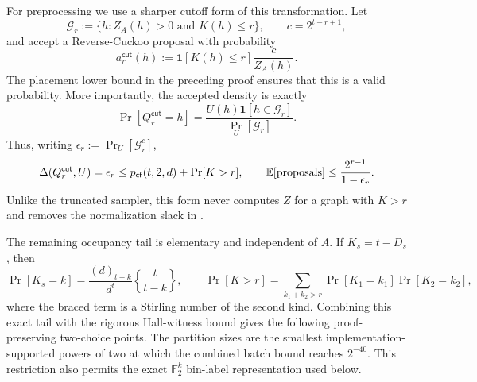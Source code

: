 For preprocessing we use a sharper cutoff form of this transformation.  Let
\[
 \mathcal G_r:=\{h:Z_A(h)>0\text{ and }K(h)\leq r\},
 \qquad c=2^{t-r+1},
\]
and accept a Reverse-Cuckoo proposal with probability
\begin{equation}\label{eq:rev-cuckoo-cutoff-accept}
 a_r^{\mathsf{cut}}(h)
 :=\mathbf 1[K(h)\leq r]\frac{c}{Z_A(h)}.
\end{equation}
The placement lower bound in the preceding proof ensures that this is a
valid probability.  More importantly, the accepted density is exactly
\begin{equation}\label{eq:rev-cuckoo-cutoff-distribution}
 \Pr[Q_r^{\mathsf{cut}}=h]
 =\frac{U(h)\mathbf 1[h\in\mathcal G_r]}{\Pr_U[\mathcal G_r]}.
\end{equation}
Thus, writing $\epsilon_r:=\Pr_U[\mathcal G_r^c]$,
\begin{equation}\label{eq:rev-cuckoo-cutoff-distance}
 \Delta(Q_r^{\mathsf{cut}},U)=\epsilon_r
 \leq p_{\mathsf{cf}}(t,2,d)+\Pr[K>r],
 \qquad
 \mathbb E[\textnormal{proposals}]
 \leq\frac{2^{r-1}}{1-\epsilon_r}.
\end{equation}
Unlike the truncated sampler, this form never computes $Z$ for a graph with
$K>r$ and removes the normalization slack in
.

The remaining occupancy tail is elementary and independent of $A$.  If
$K_s=t-D_s$, then
\begin{equation}\label{eq:rev-cuckoo-endpoint-occupancy}
 \Pr[K_s=k]
 =\frac{(d)_{t-k}}{d^t}
   \genfrac\{\}{0pt}{}{t}{t-k},
 \qquad
 \Pr[K>r]
 =\sum_{k_1+k_2>r}\Pr[K_1=k_1]\Pr[K_2=k_2],
\end{equation}
where the braced term is a Stirling number of the second kind.  Combining
this exact tail with the rigorous Hall-witness bound gives the following
proof-preserving two-choice points.  The partition sizes are the smallest
implementation-supported powers of two at which the combined batch bound
reaches $2^{-40}$.  This restriction also permits the exact
$\mathbb F_2^k$ bin-label representation used below.

